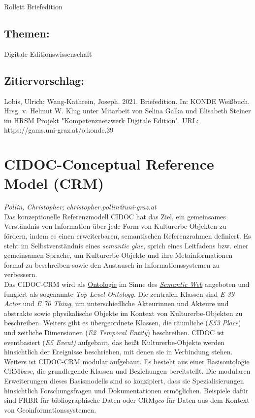 \documentclass{article}
\begin{document}
{                           Rollett Briefedition}\subsection*{Themen:}Digitale Editionswissenschaft\subsection*{Zitiervorschlag:}Lobis, Ulrich; Wang-Kathrein, Joseph. 2021. Briefedition. In: KONDE Weißbuch. Hrsg. v. Helmut W. Klug unter Mitarbeit von Selina Galka und Elisabeth Steiner im HRSM Projekt "Kompetenznetzwerk Digitale Edition". URL: https://gams.uni-graz.at/o:konde.39\newpage\section*{CIDOC-Conceptual Reference Model (CRM)} \emph{Pollin, Christopher; christopher.pollin@uni-graz.at}\\
        
    Das konzeptionelle Referenzmodell CIDOC hat das Ziel, ein gemeinsames Verständnis von Information über jede Form von Kulturerbe-Objekten zu fördern, indem es einen erweiterbaren, semantischen Referenzrahmen definiert. Es steht im Selbstverständnis eines \emph{semantic glue}, sprich eines Leitfadens bzw. einer gemeinsamen Sprache, um Kulturerbe-Objekte und ihre Metainformationen formal zu beschreiben sowie den Austausch in Informationssystemen zu verbessern. \\
            
        Das CIDOC-CRM wird als \href{http://gams.uni-graz.at/o:konde.151}{Ontologie} im Sinne des \emph{\href{http://gams.uni-graz.at/o:konde.167}{Semantic Web}} angeboten und fungiert als sogenannte \emph{Top-Level-Ontology}. Die zentralen Klassen sind \emph{E 39 Actor} und \emph{E 70 Thing}, um unterschiedliche Akteurinnen und Akteure und abstrakte sowie physikalische Objekte im Kontext von Kulturerbe-Objekten zu beschreiben. Weiters gibt es übergeordnete Klassen, die räumliche (\emph{E53 Place}) und zeitliche Dimensionen (\emph{E2 Temporal Entity}) beschreiben. CIDOC ist eventbasiert (\emph{E5 Event)} aufgebaut, das heißt Kulturerbe-Objekte werden hinsichtlich der Ereignisse beschrieben, mit denen sie in Verbindung stehen. \\
            
        Weiters ist CIDOC-CRM modular aufgebaut. Es besteht aus einer Basisontologie CRM\emph{base}, die grundlegende Klassen und Beziehungen bereitstellt. Die modularen Erweiterungen dieses Basismodells sind so konzipiert, dass sie Spezialisierungen hinsichtlich Forschungsfragen und Dokumentationen ermöglichen. Beispiele dafür sind FRBR für bibliographische Daten oder CRM\emph{geo} für Daten aus dem Kontext von Geoinformationssystemen.\\
            
\end{document}
